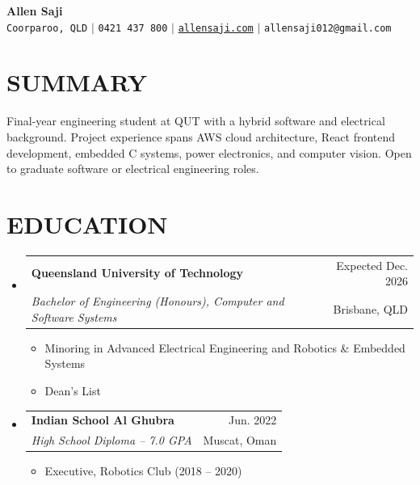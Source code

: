 \documentclass[letterpaper,11pt]{article}
\makeatletter
\newcommand{\resumeItem}[1]{
  \item\small{
    {#1 \vspace{-1pt}}
  }
}
\newcommand{\resumeSubheading}[4]{
  \vspace{-1pt}\item
    \begin{tabular*}{\textwidth}[t]{l@{\extracolsep{\fill}}r}
      \textbf{#1} & {\color{dark-grey}\small #2}\vspace{1pt}\\
      \textit{#3} & {\color{dark-grey} \small #4}\\
    \end{tabular*}\vspace{-4pt}
}
\newcommand{\resumeSubHeadingListStart}{\begin{itemize}[leftmargin=0in, label={}]}
\newcommand{\resumeSubHeadingListEnd}{\end{itemize}}
\newcommand{\resumeItemListStart}{\begin{itemize}}
\newcommand{\resumeItemListEnd}{\end{itemize}\vspace{0pt}}
\makeatother
\begin{document}
\begin{center}
    \textbf{\Huge Allen Saji} \\ \vspace{5pt}
    \small \faMapMarker* \hspace{2pt} \texttt{Coorparoo, QLD} \hspace{1pt} $|$
    \hspace{1pt} \faPhone* \hspace{2pt} \texttt{0421 437 800} \hspace{1pt} $|$
    \hspace{1pt} \faGlobe \hspace{2pt} \href{https://allensaji.com}{\texttt{allensaji.com}} \hspace{1pt} $|$
    \hspace{1pt} \faEnvelope \hspace{2pt} \texttt{allensaji012@gmail.com}
    \\ \vspace{-3pt}
\end{center}

\section{SUMMARY}
\small{Final-year engineering student at QUT with a hybrid software and electrical background. Project experience spans AWS cloud architecture, React frontend development, embedded C systems, power electronics, and computer vision. Open to graduate software or electrical engineering roles.}
\vspace{-4pt}

\section{EDUCATION}
  \resumeSubHeadingListStart
    \resumeSubheading
      {Queensland University of Technology}{Expected Dec. 2026}
      {Bachelor of Engineering (Honours), Computer and Software Systems}{Brisbane, QLD}
      \resumeItemListStart
        \resumeItem{Minoring in Advanced Electrical Engineering and Robotics \& Embedded Systems}
        \resumeItem{Dean's List}
      \resumeItemListEnd

    \resumeSubheading
      {Indian School Al Ghubra}{Jun. 2022}
      {High School Diploma -- 7.0 GPA}{Muscat, Oman}
      \resumeItemListStart
        \resumeItem{Executive, Robotics Club (2018 -- 2020)}
      \resumeItemListEnd
  \resumeSubHeadingListEnd
\end{document}

